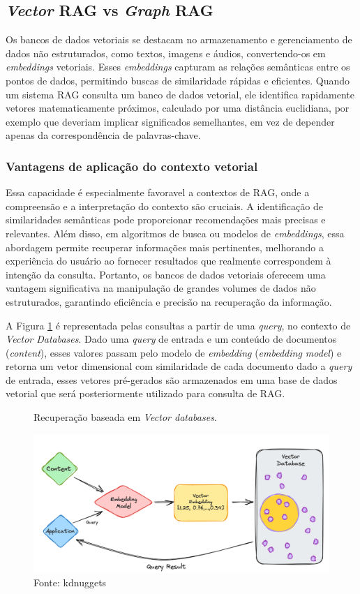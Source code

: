 \subsection{\textit{Vector} RAG vs \textit{Graph} RAG}

Os bancos de dados vetoriais se destacam no armazenamento e gerenciamento de dados não estruturados, como textos, imagens e áudios, convertendo-os em \textit{embeddings} vetoriais. Esses \textit{embeddings} capturam as relações semânticas entre os pontos de dados, permitindo buscas de similaridade rápidas e eficientes. Quando um sistema RAG consulta um banco de dados vetorial, ele identifica rapidamente vetores matematicamente próximos, calculado por uma distância euclidiana, por exemplo \cite{DANIELSSON1980227}  que deveriam implicar significados semelhantes, em vez de depender apenas da correspondência de palavras-chave.

\subsubsection{Vantagens de aplicação do contexto vetorial}
Essa capacidade é especialmente favoravel a contextos de RAG, onde a compreensão e a interpretação do contexto são cruciais. A identificação de similaridades semânticas pode proporcionar recomendações mais precisas e relevantes. Além disso, em algoritmos de busca ou modelos de \textit{embeddings}, essa abordagem permite recuperar informações mais pertinentes, melhorando a experiência do usuário ao fornecer resultados que realmente correspondem à intenção da consulta. Portanto, os bancos de dados vetoriais oferecem uma vantagem significativa na manipulação de grandes volumes de dados não estruturados, garantindo eficiência e precisão na recuperação da informação.

 A Figura \ref{fig:vector_db} é representada pelas consultas a partir de uma \textit{query}, no contexto de \textit{Vector Databases}. Dado uma \textit{query} de entrada e um conteúdo de documentos (\textit{content}), esses valores passam pelo modelo de \textit{embedding} (\textit{embedding model}) e retorna um vetor dimensional com similaridade de cada documento dado a \textit{query} de entrada, esses vetores pré-gerados são armazenados em uma base de dados vetorial que será posteriormente utilizado para consulta de RAG.

\begin{figure}[!htb]
    \centering
    \caption{Recuperação baseada em \textit{Vector databases}.}
    \includegraphics[width=\linewidth]{img/vector_db.png}
    \caption*{Fonte: kdnuggets}
    \label{fig:vector_db}
\end{figure}

